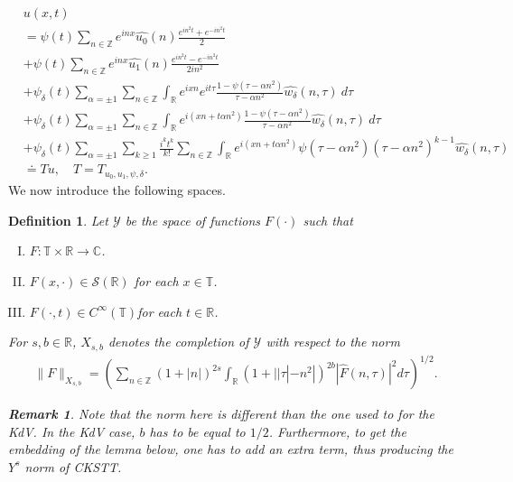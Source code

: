 \documentclass[12pt,reqno]{amsart}
\numberwithin{equation}{section}  %
\newcommand{\rr}{\mathbb{R}}
\newcommand{\zz}{\mathbb{Z}}
\newcommand{\cc}{\mathbb{C}}
\newcommand{\ci}{\mathbb{T}}
\newcommand{\wh}{\widehat}
\newtheorem{definition}[theorem]{Definition}
\newtheorem{remark}[theorem]{Remark}
\begin{document}
\begin{align}
  & u(x,t)
  \label{main1-rel-term-0}
  \\
  \label{main1-rel-term-1}
  & = \psi(t) \sum_{n \in \zz} e^{inx} \wh{u_{0}}(n) \frac{e^{in^{2}t} + e^{-in^{2}t}}{2} 
  \\
  \label{main1-rel-term-2}
  & + \psi(t) \sum_{n \in \zz} e^{inx}
  \wh{u_{1}}(n)\frac{e^{in^{2}t} - e^{-in^{2}t}}{2 i n^{2}} 
  \\
  \label{main1-rel-term-3}
  & +  \psi_{\delta}(t)\sum_{\alpha =  \pm 1} \sum_{n\in \zz} \int_\rr e^{ixn}  
  e^{it \tau} \frac{1 - \psi(\tau -  \alpha n^{2}) 
}{\tau -  \alpha n^{2}} \wh{w_{\delta}}(n, \tau) \ d \tau
  \\
  \label{main1-rel-term-4}
  & + \psi_{\delta}(t) \sum_{\alpha =  \pm 1} \sum_{n\in \zz} \int_\rr e^{i(xn + 
  t \alpha n^{2})}
  \frac{1- \psi(\tau -  \alpha n^{2})}{\tau -  \alpha n^{2}} \wh{w_{\delta}}(n, \tau) \ d \tau
  \\
  \label{main1-rel-term-4.5}
  & +  \psi_{\delta}(t) \sum_{\alpha =  \pm 1}  \sum_{k \ge 1} \frac{i^k t^k}{k!}
  \sum_{n \in \zz} \int_\rr e^{i(xn + t \alpha n^{2} )}
  \psi(\tau -  \alpha n^{2}) (\tau -  \alpha n^{2})^{k-1} \wh{w_{\delta}}(n, \tau)
  \\
  \label{main1-rel-term-5}
  & \doteq Tu, \quad T=T_{u_0, u_1, \psi, \delta}.
\end{align}
%
%
%
%
%
%
%
%
%
%
%
%
We now introduce the following spaces. 
%
%
\begin{definition}
  Let $\mathcal{Y}$ be the space of functions $F(\cdot)$ such that
  \begin{enumerate}[(I)]
   \item{$F: \ci \times \rr \to \cc$}.
   \item{$F(x, \cdot) \in \mathcal{S}(\rr)$ for each $x \in \ci$}.
   \item{$F(\cdot, t) \in C^{\infty}(\ci)$for each $t \in \rr$}.
  \end{enumerate}
  For $s, b \in \rr$, $X_{s,b}$ denotes the completion of $\mathcal{Y}$ with
  respect to the norm
  \begin{equation}
  \begin{split}
    \|F\|_{X_{s,b}} = \left( \sum_{n \in \zz} (1 + |n|)^{2s} \int_{\rr}
    (1 + | | \tau | - n^{2} |)^{2b} |\wh{F}(n, \tau)|^{2} d \tau\right)^{1/2}.
  \end{split}
  \label{eqn:bous-norm}
  \end{equation}
  \begin{framed}
    \begin{remark}
    Note that the norm here is different than the one used to for the KdV. In
    the KdV case, $b$ has to be equal to $1/2$. Furthermore, to get the embedding
    of the lemma below, one has to add an extra term, thus producing the
    $Y^{s}$ norm of CKSTT\@.
    \label{rem:alternate-space}
    \end{remark}
  \end{framed}
\end{definition}
\end{document}
